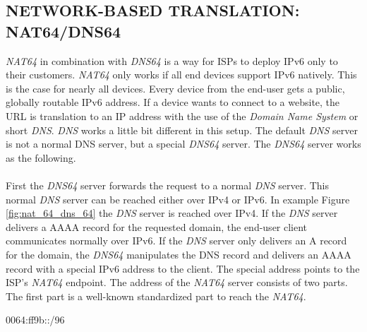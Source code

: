 \documentclass[format=sigconf, natbib=true, nonacm=true]{acmart}
\begin{document}
    \subsection{NETWORK-BASED TRANSLATION: NAT64/DNS64}
    \textit{NAT64} in combination with \textit{DNS64} is a way for ISPs to deploy IPv6 only to their customers. \textit{NAT64} only works if all end devices support IPv6 natively. This is the case for nearly all devices. Every device from the end-user gets a public, globally routable IPv6 address. If a device wants to connect to a website, the URL is translation to an IP address with the use of the \textit{Domain Name System} or short \textit{DNS}. \textit{DNS} works a little bit different in this setup. The default \textit{DNS} server is not a normal DNS server, but a special \textit{DNS64} server. The \textit{DNS64} server works as the following.\\\\First the \textit{DNS64} server forwards the request to a normal \textit{DNS} server. This normal \textit{DNS} server can be reached either over IPv4 or IPv6. In example Figure \ref{fig:nat_64_dns_64} the \textit{DNS} server is reached over IPv4. If the \textit{DNS} server delivers a AAAA record for the requested domain, the end-user client communicates normally over IPv6. If the \textit{DNS} server only delivers an A record for the domain, the \textit{DNS64} manipulates the DNS record and delivers an AAAA record with a special IPv6 address to the client. The special address points to the ISP's \textit{NAT64} endpoint. The address of the \textit{NAT64} server consists of two parts. The first part is a well-known standardized part to reach the \textit{NAT64}.
    \begin{center}
        0064:ff9b::/96
    \end{center}
\end{document}

